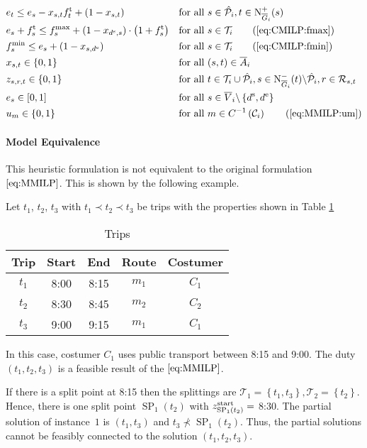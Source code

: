 \begin{align}
	& e_t \leq e_s-x_{s,t}\ft_t+\left(1-x_{s,t}\right) && \text{for all } s\in\Phat_i,t\in\Noutoi(s) \label{eq:CMILP:fuel_splitpoint} \\
	& e_s + \ft_s \leq f^{\max}_s + \left(1-x_{\ds,s}\right)\cdot\left(1+\ft_s\right) && \text{for all } s\in\Ti \tag{\ref{eq:CMILP:fmax}} \\
	& f^{\min}_s \leq e_s + \left(1-x_{s,\de}\right) && \text{for all } s\in\Ti \tag{\ref{eq:CMILP:fmin}} \\
	& x_{s,t}\in\{0,1\} & & \text{for all } (s,t)\in\overline{A}_i \label{eq:CMILP:xst} \\
	& z_{s,r,t}\in\{0,1\} & & \text{for all } t\in\Ti\cup\Phat_i,s\in\Ninoi(t)\backslash\Phat_i,r\in\Rst \label{eq:CMILP:zsrt} \\
	& e_s\in[0,1] & & \text{for all } s\in\overline{V}_i\backslash\left\{\ds,\de\right\} \label{eq:CMILP:es} \\
	& u_m\in\{0,1\} && \text{for all } m\in C^{-1}\left(\mathcal{C}_i\right) \tag{\ref{eq:MMILP:um}}
\end{align}

\paragraph{Model Equivalence} \parfill

This heuristic formulation is not equivalent to the original formulation $\eqref{eq:MMILP}$. This is shown by the following example.

\begin{example}

Let $t_1$, $t_2$, $t_3$ with $t_1\prec t_2\prec t_3$ be trips with the properties shown in Table \ref{tab:costumer_heuristic_example}

\begin{table}[hb]
	\centering
	\begin{tabular}{c|cccc}
		Trip & Start & End & Route & Costumer \\
		\hline
		$t_1$ & 8:00 & 8:15 & $m_1$ & $C_1$ \\
		$t_2$ & 8:30 & 8:45 & $m_2$ & $C_2$ \\
		$t_3$ & 9:00 & 9:15 & $m_1$ & $C_1$ \\
	\end{tabular}
	\caption{Trips}
	\label{tab:costumer_heuristic_example}
\end{table}

In this case, costumer $C_1$ uses public transport between 8:15 and 9:00. The duty $\left(t_1,t_2,t_3\right)$ is a feasible result of the $\eqref{eq:MMILP}$.

If there is a split point at 8:15 then the splittings are $\mathcal{T}_1=\left\{t_1,t_3\right\},\mathcal{T}_2=\left\{t_2\right\}$. Hence, there is one split point $\operatorname{SP}_1\left(t_2\right)$ with $z^{\operatorname{start}}_{\operatorname{SP}_1\left(t_2\right)} =$ 8:30. The partial solution of instance~$1$ is $\left(t_1,t_3\right)$ and $t_3\not\prec \operatorname{SP}_1\left(t_2\right)$. Thus, the partial solutions cannot be feasibly connected to the solution $\left(t_1,t_2,t_3\right)$.

\end{example}

